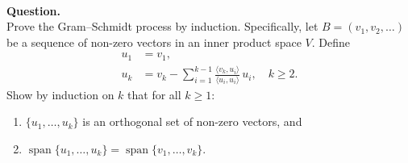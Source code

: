 \documentclass{article}
\begin{document}
\bigskip

\hfill \break  $~\!\!$ \dotfill \medskip \\
\textbf{Question.}\\
Prove the Gram--Schmidt process by induction. Specifically, let $B = (v_1, v_2, \dots)$ be a sequence of non-zero vectors in an inner product space $V$. Define
\begin{align*}
u_1 &= v_1, \\
u_k &= v_k - \sum_{i=1}^{k-1} \frac{\langle v_k, u_i \rangle}{\langle u_i, u_i \rangle}\, u_i, \quad k \ge 2.
\end{align*}
Show by induction on $k$ that for all $k \ge 1$:
\begin{enumerate}
    \item $\{u_1, \dots, u_k\}$ is an orthogonal set of non-zero vectors, and
    \item $\operatorname{span}\{u_1, \dots, u_k\} = \operatorname{span}\{v_1, \dots, v_k\}$.
\end{enumerate}
\end{document}
